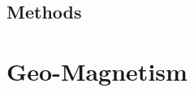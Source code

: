 \documentclass[12pt,a4paper]{article}
\begin{document}
\subsection{Methods}







\section{Geo-Magnetism}







\end{document}
